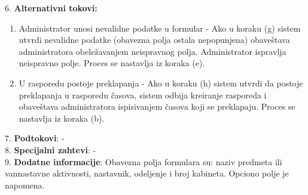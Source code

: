 \documentclass{article}
\begin{document}
6. \textbf{Alternativni tokovi:}
\begin{enumerate} [label=(\roman*)]
\item Administrator unosi nevalidne podatke u formular - Ako u koraku (g) sistem utvrdi nevalidne podatke (obavezna polja ostala nepopunjena) obaveštava administratora obeležavanjem neispravnog polja. Administrator ispravlja neispravno polje. Proces se nastavlja iz koraka (e).
\item U rasporedu postoje preklapanja - Ako u koraku (h) sistem utvrdi da postoje preklapanja u rasporedu časova, sistem odbija kreiranje rasporeda i obaveštava administratora ispisivanjem časova koji se preklapaju. Proces se nastavlja iz koraka (b).
\end{enumerate}

7. \textbf{Podtokovi}: - \\

8. \textbf{Specijalni zahtevi}: - \\

9. \textbf{Dodatne informacije}: Obavezna polja formulara su: naziv predmeta ili vannastavne aktivnosti, nastavnik, odeljenje i broj kabineta. Opciono polje je napomena. \\
\end{document}
